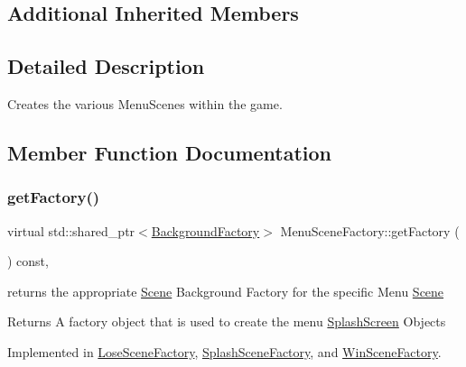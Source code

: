 \subsection*{Additional Inherited Members}


\subsection{Detailed Description}
Creates the various Menu\+Scenes within the game. 

\subsection{Member Function Documentation}
\mbox{\label{class_menu_scene_factory_ad0f60a16fdbb10c6d7ba3311dafa2e76}} 
\subsubsection{\texorpdfstring{get\+Factory()}{getFactory()}}
{\footnotesize\ttfamily virtual std\+::shared\+\_\+ptr$<$\hyperlink{class_background_factory}{Background\+Factory}$>$ Menu\+Scene\+Factory\+::get\+Factory (\begin{DoxyParamCaption}{ }\end{DoxyParamCaption}) const\hspace{0.3cm}{\ttfamily [protected]}, {}}



returns the appropriate \hyperlink{class_scene}{Scene} Background Factory for the specific Menu \hyperlink{class_scene}{Scene} 

\begin{DoxyReturn}{Returns}
A factory object that is used to create the menu \hyperlink{class_splash_screen}{Splash\+Screen} Objects 
\end{DoxyReturn}


Implemented in \hyperlink{class_lose_scene_factory_adfe18ba674cdd988bb78e3cd3218796f}{Lose\+Scene\+Factory}, \hyperlink{class_splash_scene_factory_a08e3da2eb18122670b40c3520462db51}{Splash\+Scene\+Factory}, and \hyperlink{class_win_scene_factory_af2e1c7ae34601b5f4017937d7bd381bb}{Win\+Scene\+Factory}.

\mbox{\label{class_menu_scene_factory_ade1881c377fa61d1d8fa11c1d30f4ddd}} 
